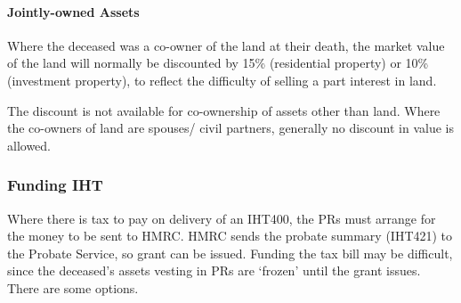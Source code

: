 \documentclass[
]{article}
\begin{document}
\hypertarget{jointly-owned-assets}{%
\paragraph{Jointly-owned Assets}\label{jointly-owned-assets}}

Where the deceased was a co-owner of the land at their death, the market
value of the land will normally be discounted by 15\% (residential
property) or 10\% (investment property), to reflect the difficulty of
selling a part interest in land.

The discount is not available for co-ownership of assets other than
land. Where the co-owners of land are spouses/ civil partners, generally
no discount in value is allowed.

\hypertarget{funding-iht}{%
\subsubsection{Funding IHT}\label{funding-iht}}

Where there is tax to pay on delivery of an IHT400, the PRs must arrange
for the money to be sent to HMRC. HMRC sends the probate summary
(IHT421) to the Probate Service, so grant can be issued. Funding the tax
bill may be difficult, since the deceased's assets vesting in PRs are
`frozen' until the grant issues. There are some options.
\end{document}
